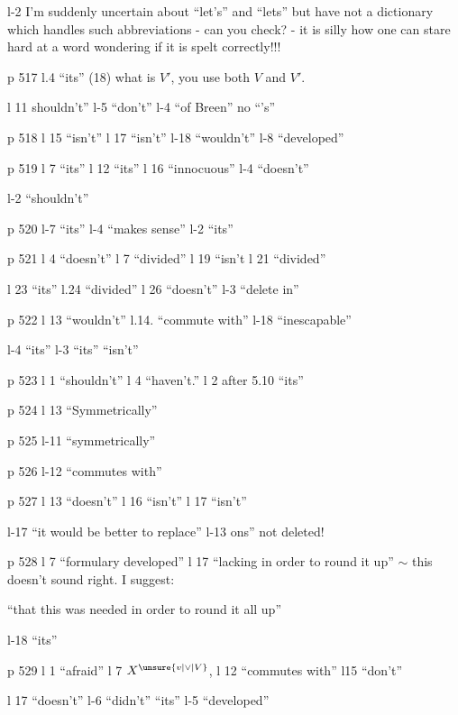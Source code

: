 l-2 I'm suddenly uncertain about ``let's'' and ``lets'' but have not a dictionary which handles such abbreviations - can you check? - it is silly how one can stare hard at a  word wondering if it is spelt correctly!!!

p 517 l.4 ``its'' \quad (18) what is $V'$, you use both $V$ and $V'$.

l 11 shouldn't'' \quad l-5 ``don't'' \quad l-4 ``of Breen'' no ``'s''

p 518 l 15 ``isn't'' \quad l 17 ``isn't'' \quad l-18 ``wouldn't'' \quad l-8 ``developed''

p 519 l 7 ``its'' \quad l 12 ``its'' \quad l 16 ``innocuous'' \quad l-4 ``doesn't''

l-2 ``shouldn't''

p 520 l-7 ``its'' \quad l-4 ``makes sense'' \quad l-2 ``its''

p 521 l 4 ``doesn't'' \quad l 7 ``divided'' \quad l 19 ``isn't \quad l 21 ``divided''

l 23 ``its'' \quad l.24 ``divided'' \quad l 26 ``doesn't'' \quad l-3 ``delete in''

p 522 l 13 ``wouldn't'' \quad l.14. ``commute with'' \quad l-18 ``inescapable''

l-4 ``its'' \quad l-3 ``its'' ``isn't''

p 523 l 1 ``shouldn't'' \quad l 4 ``haven't.'' \quad l 2 after 5.10 ``its''

p 524 l 13 ``Symmetrically''

p 525 l-11 ``symmetrically'' 

p 526 l-12 ``commutes with''

p 527 l 13 ``doesn't'' \quad l 16 ``isn't'' \quad l 17 ``isn't'' \quad {}

l-17 ``it would be better to replace'' \quad l-13 ons'' not deleted!

p 528 l 7 ``formulary developed'' \quad l 17 ``lacking in order to round it up'' \(\sim\) this doesn't sound right. I suggest:

``that this was needed in order to round it all up''

l-18 ``its''

p 529 l 1 ``afraid'' \quad l 7 $X^{\unsure{v|\vee|V}}$, \quad l 12 ``commutes with'' \quad l15 ``don't''

l 17 ``doesn't'' \quad l-6 ``didn't'' ``its'' \quad l-5 ``developed''

